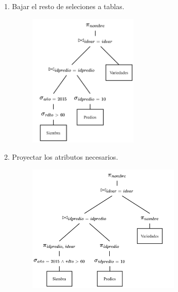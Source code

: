 \documentclass{templateNote}
\begin{document}
\begin{enumerate}
\begin{itemize}
\begin{enumerate}
            \item Bajar el resto de seleciones a tablas.
            \begin{figure}[H]
                \centering
                \includegraphics[width=0.5\textwidth]{img/E1-Paso-5.png}
            \end{figure}

            \newpage
            \item Proyectar los atributos necesarios.
            \begin{figure}[H]
                \centering
                \includegraphics[width=0.7\textwidth]{img/E1-Paso-6.png}
            \end{figure}
        \end{enumerate}

    \end{itemize}
\end{enumerate}
\end{document}
